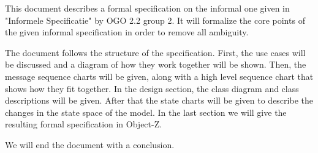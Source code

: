 This document describes a formal specification on the informal one given in "Informele Specificatie" by OGO 2.2 group 2.
It will formalize the core points of the given informal specification in order to remove all ambiguity.

The document follows the structure of the specification. First, the use cases will be discussed and a diagram of how they work together will be shown. Then, the message sequence charts will be given, along with a high level sequence chart that shows how they fit together. In the design section, the class diagram and class descriptions will be given. After that the state charts will be given to describe the changes in the state space of the model. In the last section we will give the resulting formal specification in Object-Z.

We will end the document with a conclusion.
